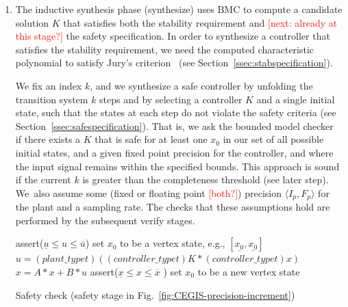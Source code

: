 \documentclass[twocolumn]{autart}    %
\renewcommand{\note}[1]{\textcolor{red}{[#1]}}
\begin{document}
\begin{enumerate}

\item The inductive synthesis phase ({\sc synthesize}) uses BMC to compute a
candidate solution $K$ that satisfies both the stability requirement and \note{next: already at this stage?} the safety specification.  
In order to synthesize a controller that satisfies the stability requirement, 
we need the computed characteristic polynomial to satisfy Jury's criterion~\cite{fadali} (see Section~\ref{ssec:stabspecification}). 

We fix an index $k$, 
and we synthesize a safe controller by
unfolding the transition system $k$ steps and by selecting a controller $K$ and a single initial state, 
such that the states at each step do not violate the safety criteria (see Section~\ref{ssec:safespecification}).    
That is, we ask the bounded model checker~\cite{ClarkeKL04} if there exists a $K$ that is safe for at least one $x_0$ in our set of all possible initial states, and a given fixed point precision for the controller, and where the input signal remains within the specified bounds.
This approach is sound if the current $k$ is greater than the completeness threshold (see later step).  
We~also assume some (fixed or floating point \note{both?}) precision $\langle I_p,F_p\rangle$ for the plant and a sampling rate.  
The checks that these assumptions hold are performed by the subsequent {\sc verify} stages. 




\begin{algorithm}[]
\begin{algorithmic}[1]
\State assert($ \underline{u}  \leq u \leq \overline{u}$)
 \State set $x_0$ to be a vertex state, e.g., $[\underline{x_0},\underline{x_0}]$	
		\State $u = (plant\_typet)((controller\_typet)K * (controller\_typet) x)$
		\State $x = A * x + B * u$
		\State assert($\underline{x} \leq x \leq \overline{x}$ )
  	\EndFor
  	\State set $x_0$ to be a new vertex state
  	\EndFor
\EndFunction
\end{algorithmic}
\caption{Safety check ({\sc safety} stage in Fig.~\ref{fig:CEGIS-precision-increment})\label{alg:safetycheck}}
\end{algorithm}


\end{enumerate}
\end{document}
